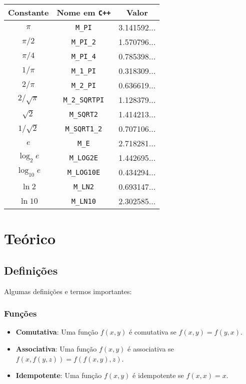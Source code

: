 \documentclass[10pt, a4paper, oneside]{book}
\begin{document}
\begin{center}
\begin{tabular}{|c|c|c|}
  \hline
  Constante & Nome em \texttt{C++} & Valor \\
  \hline
  $\pi$ & \texttt{M\_PI} & 3.141592... \\
  \hline
  $\pi / 2$ & \texttt{M\_PI\_2} & 1.570796... \\
  \hline
  $\pi / 4$ & \texttt{M\_PI\_4} & 0.785398... \\
  \hline
  $1 / \pi$ & \texttt{M\_1\_PI} & 0.318309... \\
  \hline
  $2 / \pi$ & \texttt{M\_2\_PI} & 0.636619... \\
  \hline
  $2 / \sqrt{\pi}$ & \texttt{M\_2\_SQRTPI} & 1.128379... \\
  \hline
  $\sqrt{2}$ & \texttt{M\_SQRT2} & 1.414213... \\
  \hline
  $1 / \sqrt{2}$ & \texttt{M\_SQRT1\_2} & 0.707106... \\
  \hline
  $e$ & \texttt{M\_E} & 2.718281... \\
  \hline
  $\log_2{e}$ & \texttt{M\_LOG2E} & 1.442695... \\
  \hline
  $\log_{10}{e}$ & \texttt{M\_LOG10E} & 0.434294... \\
  \hline
  $\ln{2}$ & \texttt{M\_LN2} & 0.693147... \\
  \hline
  $\ln{10}$ & \texttt{M\_LN10} & 2.302585... \\
  \hline
\end{tabular}
\end{center}
\chapter{Teórico}


\section {Definições}

Algumas definições e termos importantes:


\subsection{Funções}

\begin{itemize}
  \item \textbf{Comutativa}: Uma função $f(x, y)$ é comutativa se $f(x, y) = f(y, x)$.
  \item \textbf{Associativa}: Uma função $f(x, y)$ é associativa se $f(x, f(y, z)) = f(f(x, y), z)$.
  \item \textbf{Idempotente}: Uma função $f(x, y)$ é idempotente se $f(x, x) = x$.
\end{itemize}
\end{document}
